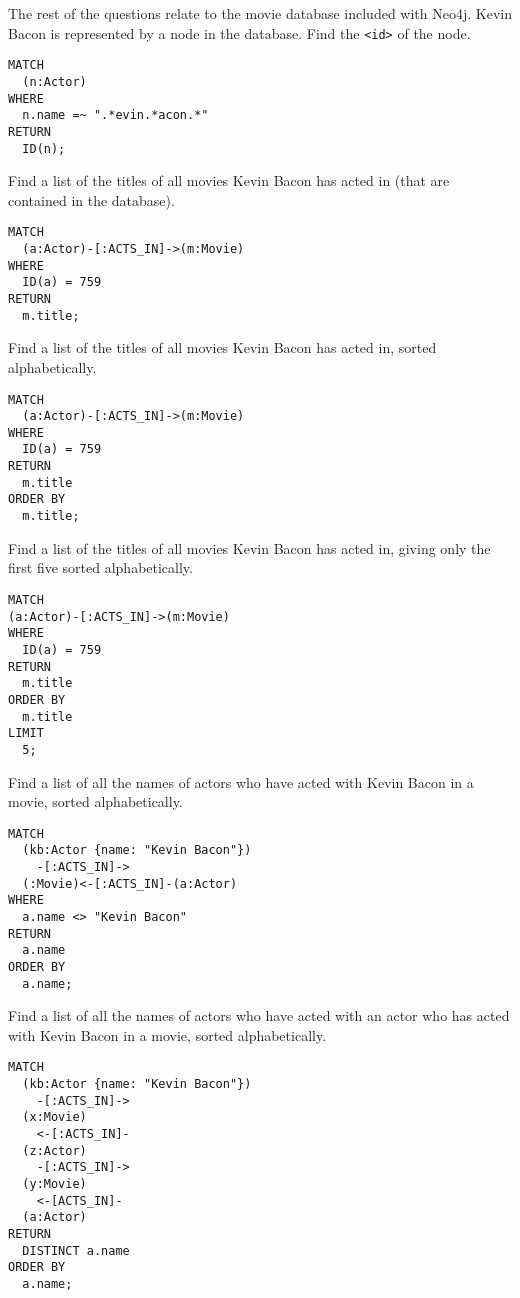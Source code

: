 \documentclass[a4paper,12pt]{exam}
\begin{document}
\begin{questions}
\question
The rest of the questions relate to the movie database included with Neo4j.
Kevin Bacon is represented by a node in the database.
Find the \texttt{<id>} of the node.
\begin{solution}
\begin{verbatim}
MATCH
  (n:Actor)
WHERE
  n.name =~ ".*evin.*acon.*"
RETURN
  ID(n);
\end{verbatim}
\end{solution}


\question
Find a list of the titles of all movies Kevin Bacon has acted in (that are contained in the database).
\begin{solution}
\begin{verbatim}
MATCH
  (a:Actor)-[:ACTS_IN]->(m:Movie)
WHERE
  ID(a) = 759
RETURN
  m.title;
\end{verbatim}
\end{solution}


\question
Find a list of the titles of all movies Kevin Bacon has acted in, sorted alphabetically.
\begin{solution}
\begin{verbatim}
MATCH
  (a:Actor)-[:ACTS_IN]->(m:Movie)
WHERE
  ID(a) = 759
RETURN
  m.title
ORDER BY
  m.title;
\end{verbatim}
\end{solution}


\question
Find a list of the titles of all movies Kevin Bacon has acted in, giving only the first five sorted alphabetically.
\begin{solution}
\begin{verbatim}
MATCH
(a:Actor)-[:ACTS_IN]->(m:Movie)
WHERE
  ID(a) = 759
RETURN
  m.title
ORDER BY
  m.title
LIMIT
  5;
\end{verbatim}
\end{solution}


\question
Find a list of all the names of actors who have acted with Kevin Bacon in a movie, sorted alphabetically.
\begin{solution}
\begin{verbatim}
MATCH
  (kb:Actor {name: "Kevin Bacon"})
    -[:ACTS_IN]->
  (:Movie)<-[:ACTS_IN]-(a:Actor)
WHERE
  a.name <> "Kevin Bacon"
RETURN
  a.name
ORDER BY
  a.name;
\end{verbatim}
\end{solution}

\question
Find a list of all the names of actors who have acted with an actor who has acted with Kevin Bacon in a movie, sorted alphabetically.
\begin{solution}
  \begin{verbatim}
MATCH
  (kb:Actor {name: "Kevin Bacon"})
    -[:ACTS_IN]->
  (x:Movie)
    <-[:ACTS_IN]-
  (z:Actor)
    -[:ACTS_IN]->
  (y:Movie)
    <-[ACTS_IN]-
  (a:Actor)
RETURN
  DISTINCT a.name
ORDER BY
  a.name;
  \end{verbatim}
\end{solution}



\end{questions}
\end{document}
